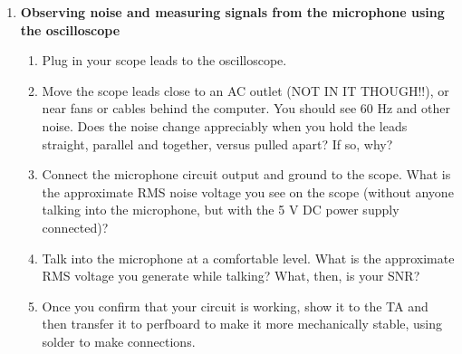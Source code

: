 \documentclass[12pt]{article}
\begin{document}
\begin{enumerate}
\item {\bf Observing noise and measuring signals from the microphone using the oscilloscope}
\begin{enumerate} 
\item Plug in your scope leads to the oscilloscope. 
\item Move the scope leads close to an AC outlet (NOT IN IT THOUGH!!), or near fans or cables behind the computer. You should see 60 Hz and other noise. Does the noise change appreciably when you hold the leads straight, parallel and together, versus pulled apart? If so, why?
\item Connect the microphone circuit output and ground to the scope. What is the approximate RMS noise voltage you see on the scope (without anyone talking into the microphone, but with the 5 V DC power supply connected)?
\item Talk into the microphone at a comfortable level. What is the approximate RMS voltage you generate while talking? What, then, is your SNR?
\item Once you confirm that your circuit is working, show it to the TA and then transfer it to perfboard to make it more mechanically stable, 
using solder to make connections.
\end{enumerate}


\end{enumerate}
\end{document}
